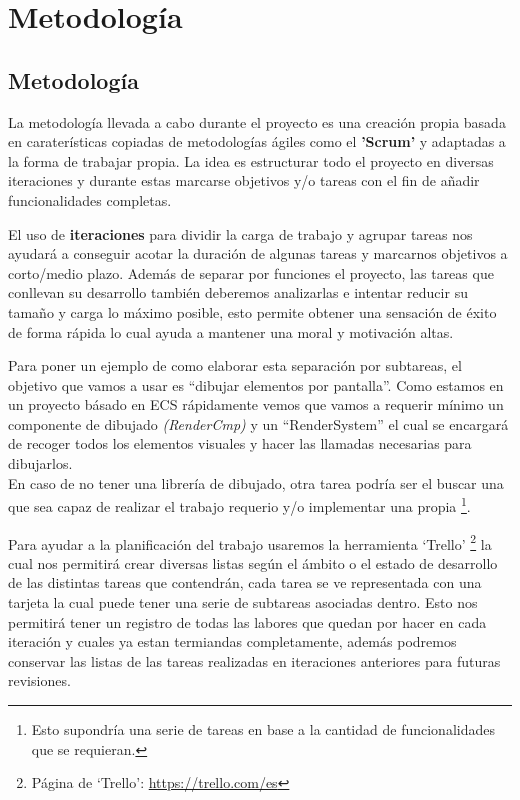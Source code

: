\chapter{Metodología}
\label{metodologia}

\section{Metodología}
La metodología llevada a cabo durante el proyecto es una creación propia basada en caraterísticas
copiadas de metodologías ágiles como el \textbf{'Scrum'} y adaptadas a la forma de trabajar propia.
La idea es estructurar todo el proyecto en diversas iteraciones y durante estas marcarse
objetivos y/o tareas con el fin de añadir funcionalidades completas.

El uso de \textbf{iteraciones} para dividir la carga de trabajo y agrupar tareas nos ayudará
a conseguir acotar la duración de algunas tareas y marcarnos objetivos a corto/medio
plazo. Además de separar por funciones el proyecto, las tareas que conllevan su desarrollo
también deberemos analizarlas e intentar reducir su tamaño y carga lo máximo posible, esto
permite obtener una sensación de éxito de forma rápida lo cual ayuda a mantener una moral y 
motivación altas.

Para poner un ejemplo de como elaborar esta separación por subtareas, el objetivo que vamos a
usar es ``dibujar elementos por pantalla''. Como estamos en un proyecto básado en \ac{ECS} rápidamente
vemos que vamos a requerir mínimo un componente de dibujado \textit{(RenderCmp)} y un 
``RenderSystem'' el cual se encargará de recoger todos los elementos visuales y hacer las
llamadas necesarias para dibujarlos. \\
En caso de no tener una librería de dibujado, otra tarea podría ser el buscar una que sea capaz
de realizar el trabajo requerio y/o implementar una propia
\footnote{Esto supondría una serie de tareas en base a la cantidad de funcionalidades que se requieran.}. 

Para ayudar a la planificación del trabajo usaremos la herramienta `Trello'
\footnote{Página de `Trello': \url{https://trello.com/es}}
la cual nos permitirá crear diversas listas según el ámbito o el estado de
desarrollo de las distintas tareas que contendrán, cada tarea se ve representada con
una tarjeta la cual puede tener una serie de subtareas asociadas dentro. Esto nos
permitirá tener un registro de todas las labores que quedan por hacer en cada iteración y
cuales ya estan termiandas completamente, además podremos conservar las listas de las tareas
realizadas en iteraciones anteriores para futuras revisiones.

